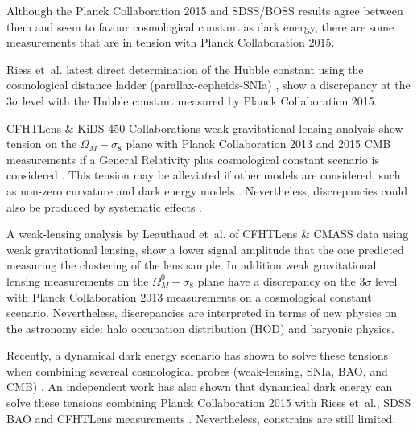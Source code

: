 Although the Planck Collaboration 2015 and SDSS/BOSS results agree between them and seem to favour cosmological constant as dark energy, there are some measurements that are in tension with Planck Collaboration 2015. 
\newline

Riess et~al. latest direct determination of the Hubble constant using the cosmological distance ladder (parallax-cepheids-SNIa) \cite{2016ApJ...826...56R}, show a discrepancy at the $3\sigma$ level with the Hubble constant measured by Planck Collaboration 2015.
\newline

CFHTLens \& KiDS-450 Collaborations weak gravitational lensing analysis show tension on the $\Omega_M-\sigma_8$ plane with Planck Collaboration 2013 \cite{2014A&A...571A..16P} and 2015 CMB measurements if a General Relativity plus cosmological constant scenario is considered \cite{2013MNRAS.430.2200K,2017arXiv170303383H}. This tension may be alleviated if other models are considered, such as non-zero curvature and dark energy models \cite{2016arXiv161004606J}. Nevertheless, discrepancies could also be produced by systematic effects \cite{2015PhRvD..92b3003D,2017MNRAS.465.2033J}.
\newline

A weak-lensing analysis by Leauthaud et~al. \cite{2017MNRAS.467.3024L} of CFHTLens \& CMASS data using weak gravitational lensing, show a lower signal amplitude that the one predicted measuring the clustering of the lens sample. In addition weak gravitational lensing measurements on the $\Omega_M^0-\sigma_8$ plane have a discrepancy on the $3\sigma$ level with Planck Collaboration 2013 measurements on a cosmological constant scenario. Nevertheless, discrepancies are interpreted in terms of new physics on the astronomy side: halo occupation distribution (HOD) and baryonic physics.
\newline

Recently, a dynamical dark energy scenario has shown to solve these tensions when combining severeal cosmological probes (weak-lensing, SNIa, BAO, and CMB) \cite{2017arXiv170108165Z}. An independent work has also shown that dynamical dark energy can solve these tensions combining Planck Collaboration 2015 with Riess et~al., SDSS BAO and CFHTLens measurements \cite{2017arXiv170400762D}. Nevertheless, constrains are still limited.
\newline

